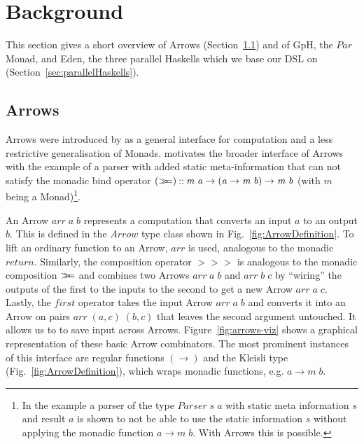 \documentclass{jfp1}
\newcommand{\Conid}[1]{\mathit{#1}}
\newcommand{\Varid}[1]{\mathit{#1}}
\newcommand{\bind}{\mathbin{>\!\!\!>\mkern-6.7mu=}}
\begin{document}
        \section{Background}
	\label{sec:background}
	This section gives a short overview of Arrows
        (Section~\ref{sec:arrows}) and of GpH, the \ensuremath{\Conid{Par}} Monad, and
        Eden, the three parallel Haskells which we base our DSL on
        (Section~\ref{sec:parallelHaskells}).
	\subsection{Arrows}
\label{sec:arrows}
Arrows were introduced by \citet{HughesArrows} as a general interface for computation and a less restrictive generalisation of Monads. \citeauthor{HughesArrows} motivates the broader interface of Arrows with the example of a parser with added static meta-information that can not satisfy the monadic bind operator \ensuremath{(\bind )\mathbin{::}\Varid{m}\;\Varid{a}\to (\Varid{a}\to \Varid{m}\;\Varid{b})\to \Varid{m}\;\Varid{b}} (with \ensuremath{\Varid{m}} being a Monad)\footnote{In the example a parser of the type \ensuremath{\Conid{Parser}\;\Varid{s}\;\Varid{a}} with static meta information \ensuremath{\Varid{s}} and result \ensuremath{\Varid{a}} is shown to not be able to use the static information \ensuremath{\Varid{s}} without applying the monadic function \ensuremath{\Varid{a}\to \Varid{m}\;\Varid{b}}. With Arrows this is possible.}.

An Arrow \ensuremath{\Varid{arr}\;\Varid{a}\;\Varid{b}} represents a computation that converts an input \ensuremath{\Varid{a}} to an output \ensuremath{\Varid{b}}. This is defined in the \ensuremath{\Conid{Arrow}} type class shown in Fig.~\ref{fig:ArrowDefinition}.
%
To lift an ordinary function to an Arrow, \ensuremath{\Varid{arr}} is used, analogous to the monadic \ensuremath{\Varid{return}}. Similarly, the composition operator \ensuremath{\mathbin{>\!\!>\!\!>}} is analogous to the monadic composition \ensuremath{\bind } and combines two Arrows \ensuremath{\Varid{arr}\;\Varid{a}\;\Varid{b}} and \ensuremath{\Varid{arr}\;\Varid{b}\;\Varid{c}} by \enquote{wiring} the outputs of the first to the inputs to the second to get a new Arrow \ensuremath{\Varid{arr}\;\Varid{a}\;\Varid{c}}. Lastly, the \ensuremath{\Varid{first}} operator takes the input Arrow \ensuremath{\Varid{arr}\;\Varid{a}\;\Varid{b}} and converts it into an Arrow on pairs \ensuremath{\Varid{arr}\;(\Varid{a},\Varid{c})\;(\Varid{b},\Varid{c})} that leaves the second argument untouched. It allows us to to save input across Arrows. Figure~\ref{fig:arrows-viz} shows a graphical representation of these basic Arrow combinators.
The most prominent instances of this interface are regular functions \ensuremath{(\to )}
and the Kleisli type (Fig.~\ref{fig:ArrowDefinition}), which wraps monadic functions, e.g.  \ensuremath{\Varid{a}\to \Varid{m}\;\Varid{b}}.
\end{document}
